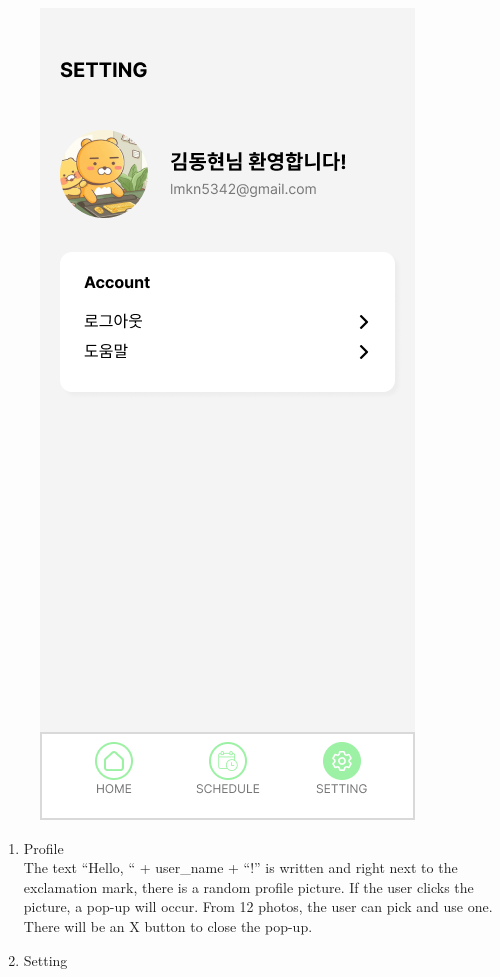 \documentclass[conference]{IEEEtran}
\begin{document}
\begin{enumerate}[label=\arabic*.]
\begin{enumerate}[label=\alph*.]
        \begin{figure}[H]\centering\includegraphics[scale=0.3]{images/setting.png}\end{figure}        
        \begin{enumerate}[label=\roman*.]
            \item {\large{Profile}} \\
            The text “Hello, “ + user\_name + “!” is written and right next to the exclamation mark, there is a random profile picture. If the user clicks the picture, a pop-up will occur. From 12 photos, the user can pick and use one. There will be an X button to close the pop-up.
            \item {\large{Setting}}\\

\end{enumerate}
\end{enumerate}
\end{enumerate}
\end{document}
